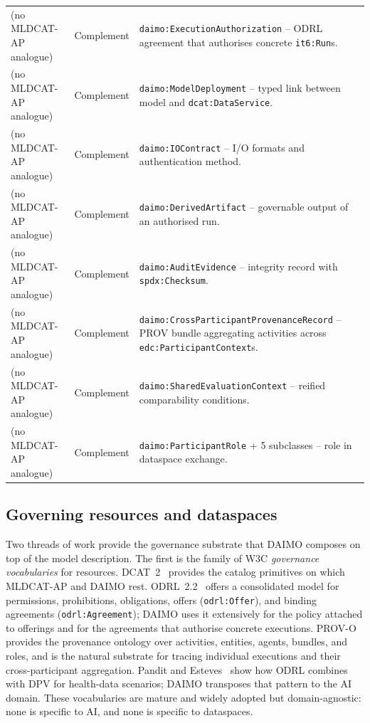 \documentclass[Afour,sagev,times]{sagej}
\newcommand{\code}[1]{\texttt{#1}}
\begin{document}
\begin{table}[t]
\begin{tabular}{@{}p{3.6cm}p{2.4cm}p{8cm}@{}}
(no MLDCAT-AP analogue) & Complement & \code{daimo:ExecutionAuthorization} -- ODRL agreement that authorises concrete \code{it6:Run}s. \\
(no MLDCAT-AP analogue) & Complement & \code{daimo:ModelDeployment} -- typed link between model and \code{dcat:DataService}. \\
(no MLDCAT-AP analogue) & Complement & \code{daimo:IOContract} -- I/O formats and authentication method. \\
(no MLDCAT-AP analogue) & Complement & \code{daimo:DerivedArtifact} -- governable output of an authorised run. \\
(no MLDCAT-AP analogue) & Complement & \code{daimo:AuditEvidence} -- integrity record with \code{spdx:Checksum}. \\
(no MLDCAT-AP analogue) & Complement & \code{daimo:CrossParticipantProvenanceRecord} -- PROV bundle aggregating activities across \code{edc:ParticipantContext}s. \\
(no MLDCAT-AP analogue) & Complement & \code{daimo:SharedEvaluationContext} -- reified comparability conditions. \\
(no MLDCAT-AP analogue) & Complement & \code{daimo:ParticipantRole} + 5 subclasses -- role in dataspace exchange. \\
\bottomrule
\end{tabular}
\end{table}

\subsection{Governing resources and dataspaces}

Two threads of work provide the governance substrate that DAIMO composes on top of the model description. The first is the family of W3C \emph{governance vocabularies} for resources. DCAT~2~\cite{dcat2} provides the catalog primitives on which MLDCAT-AP and DAIMO rest. ODRL~2.2~\cite{odrl22} offers a consolidated model for permissions, prohibitions, obligations, offers (\code{odrl:Offer}), and binding agreements (\code{odrl:Agreement}); DAIMO uses it extensively for the policy attached to offerings and for the agreements that authorise concrete executions. PROV-O~\cite{provo} provides the provenance ontology over activities, entities, agents, bundles, and roles, and is the natural substrate for tracing individual executions and their cross-participant aggregation. Pandit and Esteves~\cite{pandit-esteves} show how ODRL combines with DPV for health-data scenarios; DAIMO transposes that pattern to the AI domain. These vocabularies are mature and widely adopted but domain-agnostic: none is specific to AI, and none is specific to dataspaces.
\end{document}
